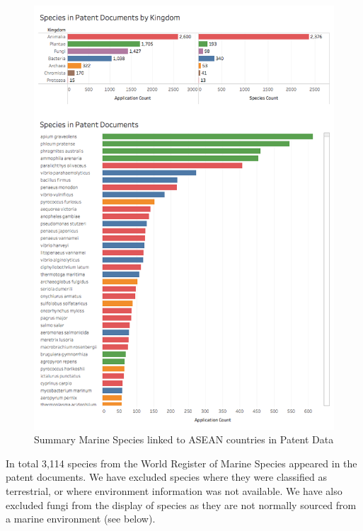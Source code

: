 \documentclass[openany]{book}
\theoremstyle{definition}
\theoremstyle{definition}
\theoremstyle{definition}
\theoremstyle{remark}
\begin{document}
\begin{figure}

{\centering \includegraphics[width=1\linewidth]{images-patents/patent_species_dashboard} 

}

\caption{Summary Marine Species linked to ASEAN countries in Patent Data}\label{fig:patentspecies}
\end{figure}

In total 3,114 species from the World Register of Marine Species
appeared in the patent documents. We have excluded species where they
were classified as terrestrial, or where environment information was not
available. We have also excluded fungi from the display of species as
they are not normally sourced from a marine environment (see below).
\end{document}
